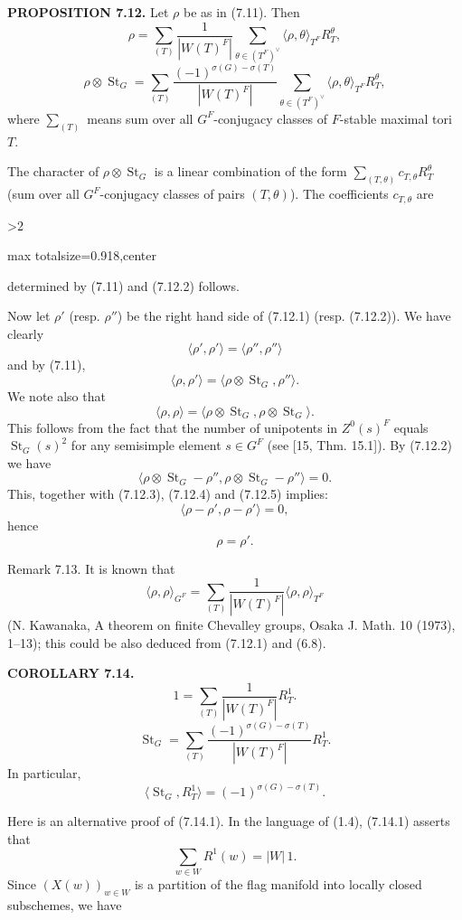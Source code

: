 \documentclass[9pt,twoside]{extarticle}
\newcommand{\EditionPage}[3]{%
  \ifnum#1>2\clearpage\fi
  \pdfbookmark[1]{Printed page #2}{en-folio-#2}%
  \hypertarget{en-physical-#1}{}%
  \noindent\begin{adjustbox}{max totalsize={\textwidth}{0.918\textheight},center}
  \begin{minipage}[t]{\textwidth}
  \fontsize{9.4}{11.1}\selectfont\justifying
  #3
  \end{minipage}
  \end{adjustbox}%
}
\begin{document}
{\noindent\textbf{PROPOSITION 7.12.} Let \(\rho\) be as in (7.11). Then \[
\tag{7.12.1}
\rho=
\sum_{(T)}\frac1{|W(T)^F|}
\sum_{\theta\in(T^F)^\vee}
\langle\rho,\theta\rangle_{T^F}R_T^\theta,
\]  \[
\tag{7.12.2}
\rho\otimes\operatorname{St}_G=
\sum_{(T)}\frac{(-1)^{\sigma(G)-\sigma(T)}}{|W(T)^F|}
\sum_{\theta\in(T^F)^\vee}
\langle\rho,\theta\rangle_{T^F}R_T^\theta,
\] where \(\sum_{(T)}\) means sum over all \(G^F\)-conjugacy classes of \(F\)-stable maximal tori \(T\).\par

The character of \(\rho\otimes\operatorname{St}_G\) is a linear combination of the form \(\sum_{(T,\theta)}c_{T,\theta}R_T^\theta\) (sum over all \(G^F\)-conjugacy classes of pairs \((T,\theta)\)). The coefficients \(c_{T,\theta}\) are\par
}

\EditionPage{44}{145}{%
determined by (7.11) and (7.12.2) follows.\par

Now let \(\rho'\) (resp. \(\rho''\)) be the right hand side of (7.12.1) (resp. (7.12.2)). We have clearly \[
\tag{7.12.3}
\langle\rho',\rho'\rangle=\langle\rho'',\rho''\rangle
\] and by (7.11), \[
\tag{7.12.4}
\langle\rho,\rho'\rangle=\langle\rho\otimes\operatorname{St}_G,\rho''\rangle.
\] We note also that \[
\tag{7.12.5}
\langle\rho,\rho\rangle
=
\langle\rho\otimes\operatorname{St}_G,\rho\otimes\operatorname{St}_G\rangle.
\] This follows from the fact that the number of unipotents in \(Z^0(s)^F\) equals \(\operatorname{St}_G(s)^2\) for any semisimple element \(s\in G^F\) (see [15, Thm. 15.1]). By (7.12.2) we have \[
\langle\rho\otimes\operatorname{St}_G-\rho'',\rho\otimes\operatorname{St}_G-\rho''\rangle=0.
\] This, together with (7.12.3), (7.12.4) and (7.12.5) implies: \[
\langle\rho-\rho',\rho-\rho'\rangle=0,
\] hence \[
\rho=\rho'.
\]\par

Remark 7.13. It is known that \[
\langle\rho,\rho\rangle_{G^F}
=
\sum_{(T)}\frac1{|W(T)^F|}\langle\rho,\rho\rangle_{T^F}
\] (N. Kawanaka, A theorem on finite Chevalley groups, Osaka J. Math. 10 (1973), 1--13); this could be also deduced from (7.12.1) and (6.8).\par

\noindent\textbf{COROLLARY 7.14.} \[
\tag{7.14.1}
1=\sum_{(T)}\frac1{|W(T)^F|}R_T^1.
\]  \[
\tag{7.14.2}
\operatorname{St}_G
=\sum_{(T)}\frac{(-1)^{\sigma(G)-\sigma(T)}}{|W(T)^F|}R_T^1.
\] In particular, \[
\langle\operatorname{St}_G,R_T^1\rangle=(-1)^{\sigma(G)-\sigma(T)}.
\]\par

Here is an alternative proof of (7.14.1). In the language of (1.4), (7.14.1) asserts that \[
\sum_{w\in W}R^1(w)=|W|\,1.
\] Since \((X(w))_{w\in W}\) is a partition of the flag manifold into locally closed subschemes, we have\par
}
\end{document}
